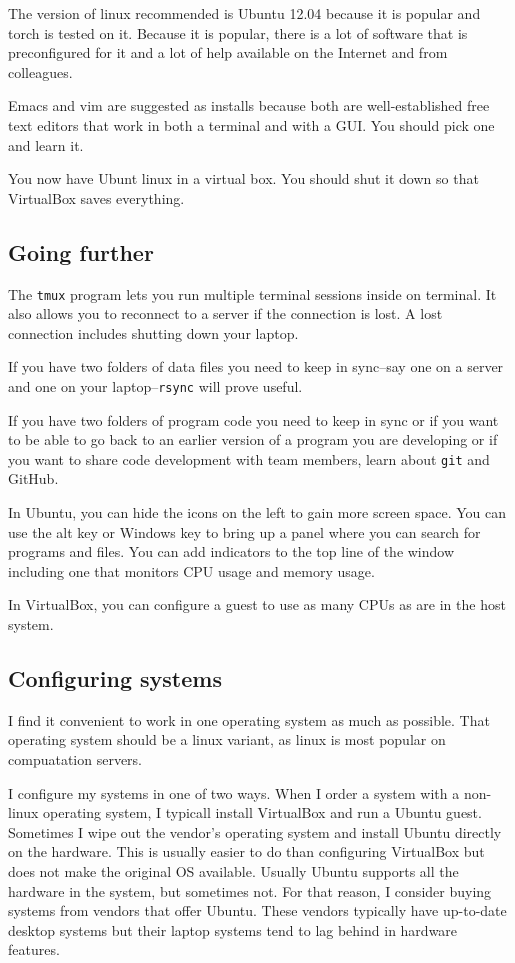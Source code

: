 \documentclass{article}
\let\code\texttt %
\begin{document}
The version of linux recommended is Ubuntu 12.04 because it is popular
and torch is tested on it. Because it is popular, there is a lot of
software that is preconfigured for it and a lot of help available on the
Internet and from colleagues. 

Emacs and vim are suggested as installs because both are
well-established free text editors that work in both a terminal and with
a GUI. You should pick one and learn it.

You now have Ubunt linux in a virtual box. You should shut it down so
that VirtualBox saves everything.

\subsection{Going further}

The \code{tmux} program lets you run multiple terminal sessions inside
on terminal. It also allows you to reconnect to a server if the
connection is lost. A lost connection includes shutting down your
laptop.

If you have two folders of data files you need to keep in sync--say one
on a server and one on your laptop--\code{rsync} will prove useful.

If you have two folders of program code you need to keep in sync or if
you want to be able to go back to an earlier version of a program you
are developing or if you want to share code development with team
members, learn about \code{git} and GitHub. 

In Ubuntu, you can hide the icons on the left to gain more screen space.
You can use the alt key or Windows key to bring up a panel where you can
search for programs and files. You can add indicators to the top line of
the window including one that monitors CPU usage and memory usage.

In VirtualBox, you can configure a guest to use as many CPUs as are in
the host system.


\subsection{Configuring systems}

I find it convenient to work in one operating system as much as
possible. That operating system should be a linux variant, as linux is
most popular on compuatation servers.

I configure my systems in one of two ways. When I order a system with a
non-linux operating system, I typicall install VirtualBox and run a
Ubuntu guest. Sometimes I wipe out the vendor's operating system and
install Ubuntu directly on the hardware. This is usually easier to do
than configuring VirtualBox but does not make the original OS available.
Usually Ubuntu supports all the hardware in the system, but sometimes
not. For that reason, I consider buying systems from vendors that offer
Ubuntu. These vendors typically have up-to-date desktop systems but
their laptop systems tend to lag behind in hardware features.   
\end{document}
